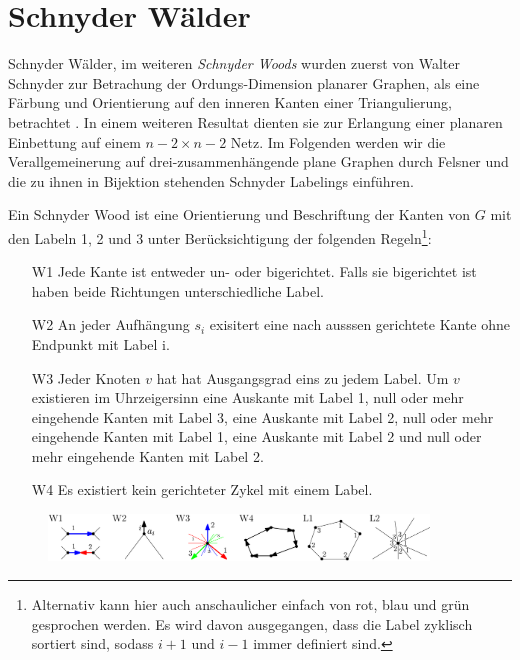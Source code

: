 \section{Schnyder Wälder}\label{sw}
Schnyder Wälder, im weiteren \textit{Schnyder Woods} wurden zuerst von Walter Schnyder zur Betrachung der Ordungs-Dimension planarer Graphen, als eine Färbung und Orientierung auf den inneren Kanten einer Triangulierung, betrachtet \cite{schnyder89}. In einem weiteren Resultat dienten sie zur Erlangung einer planaren Einbettung auf einem $n-2 \times n-2$ Netz\cite{schnyder90}. Im Folgenden werden wir die Verallgemeinerung auf drei-zusammenhängende plane Graphen durch Felsner \cite{felsner01} und die zu ihnen in Bijektion stehenden Schnyder Labelings einführen.\\
\begin{definition}
Ein Schnyder Wood ist eine Orientierung und Beschriftung der Kanten von $G$ mit den Labeln 1, 2 und 3 unter Berücksichtigung der folgenden Regeln\footnote{Alternativ kann hier auch anschaulicher einfach von rot, blau und grün gesprochen werden. Es wird davon ausgegangen, dass die Label zyklisch sortiert sind, sodass $i+1$ und $i-1$ immer definiert sind.}:
\begin{itemize}
\item[W1] Jede Kante ist entweder un- oder bigerichtet. Falls sie bigerichtet ist haben beide Richtungen unterschiedliche Label.
\item[W2] An jeder Aufhängung  $s_i$ exisitert eine nach ausssen gerichtete Kante ohne Endpunkt mit Label i.  
\item[W3] Jeder Knoten $v$ hat hat Ausgangsgrad eins zu jedem Label. Um $v$ existieren im Uhrzeigersinn eine Auskante mit Label 1, null oder mehr eingehende Kanten mit Label 3, eine Auskante mit Label 2, null oder mehr  eingehende Kanten mit Label 1, eine Auskante mit Label 2 und null oder mehr  eingehende Kanten mit Label 2.
\item[W4] Es existiert kein gerichteter Zykel mit einem Label.
\end{itemize}

\end{definition}

\begin{figure}[h]
	\centering
  \includegraphics[width=0.9\textwidth]{schnyder_wood_def.png}
	\label{10_example}
\end{figure}

